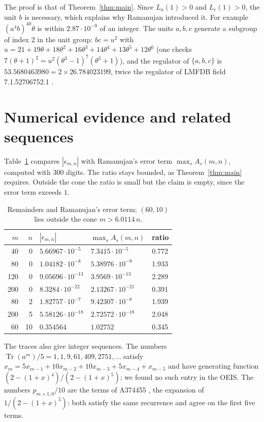 \documentclass[11pt]{article}
\theoremstyle{remark}
\newcommand{\Tr}{\operatorname{Tr}}
\begin{document}
The proof is that of Theorem~\ref{thm:main}. Since $L_a(1)>0$ and $L_c(1)>0$, the unit $b$ is necessary, which explains why
Ramanujan introduced it. For example $(a^4b)^{40}\theta$ is within $2.87\cdot10^{-9}$ of an integer. The units $a,b,c$ generate a
subgroup of index $2$ in the unit group: $bc=u^2$ with $u=21+19\theta+18\theta^2+16\theta^3+14\theta^4+13\theta^5+12\theta^6$
(one checks $7(\theta+1)^2=u^2(\theta^3-1)^7(\theta^3+1)$), and the regulator of $\{a,b,c\}$ is $53.5680463980=2\times26.784023199$, twice
the regulator of LMFDB field 7.1.52706752.1 \cite{LMFDB}.

\section{Numerical evidence and related sequences}
Table~\ref{tab:num} compares $|\epsilon_{m,n}|$ with Ramanujan's error term $\max_sA_s(m,n)$, computed with 300 digits. The ratio stays
bounded, as Theorem~\ref{thm:main} requires. Outside the cone the ratio is small but the claim is empty, since the error term exceeds $1$.

\begin{table}[ht]
\centering
\begin{tabular}{rrlll}
\toprule
$m$ & $n$ & $|\epsilon_{m,n}|$ & $\max_sA_s(m,n)$ & ratio\\
\midrule
40 & 0 & $5.66967\cdot10^{-5}$ & $7.3415\cdot10^{-5}$ & 0.772\\
80 & 0 & $1.04182\cdot10^{-8}$ & $5.38976\cdot10^{-9}$ & 1.933\\
120 & 0 & $9.05696\cdot10^{-13}$ & $3.9569\cdot10^{-13}$ & 2.289\\
200 & 0 & $8.3284\cdot10^{-22}$ & $2.13267\cdot10^{-21}$ & 0.391\\
80 & 2 & $1.82757\cdot10^{-7}$ & $9.42307\cdot10^{-8}$ & 1.939\\
200 & 5 & $5.58126\cdot10^{-18}$ & $2.72572\cdot10^{-18}$ & 2.048\\
60 & 10 & $0.354564$ & $1.02752$ & 0.345\\
\bottomrule
\end{tabular}
\caption{Remainders and Ramanujan's error term; $(60,10)$ lies outside the cone $m>6.0114\,n$.}\label{tab:num}
\end{table}

The traces also give integer sequences. The numbers $\Tr(a^m)/5=1,1,9,61,409,2751,\dots$ satisfy
$x_m=5x_{m-1}+10x_{m-2}+10x_{m-3}+5x_{m-4}+x_{m-5}$ and have generating function $(2-(1+x)^4)/(2-(1+x)^5)$; we found no such entry in the
OEIS. The numbers $p_{m+1,0}/10$ are the terms of A374455 \cite{OEIS}, the expansion of $1/(2-(1+x)^5)$: both satisfy the same
recurrence and agree on the first five terms.
\end{document}
